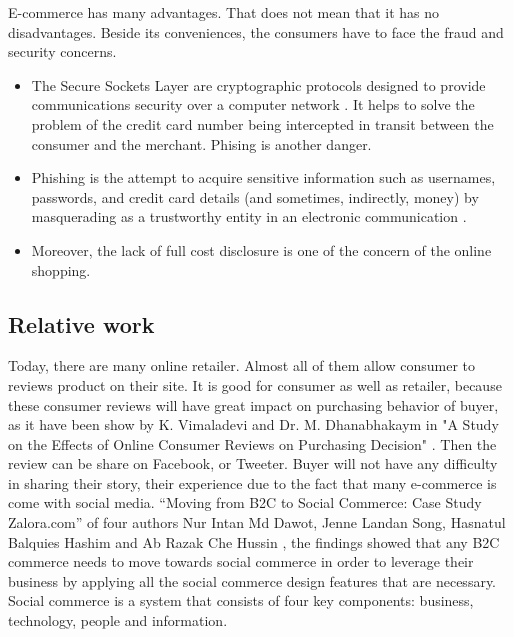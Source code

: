 \documentclass[conference]{IEEEtran}
\begin{document}
E-commerce has many advantages. That does not mean that it has no disadvantages. Beside its conveniences, the consumers have to face the fraud and security concerns.

\begin{itemize}
\item The Secure Sockets Layer are cryptographic protocols designed to provide communications security over a computer network \cite{dierks2008transport} . It helps to solve the problem of the credit card number being intercepted in transit between the consumer and the merchant. Phising is another danger.
\item Phishing is the attempt to acquire sensitive information such as usernames, passwords, and credit card details (and sometimes, indirectly, money) by masquerading as a trustworthy entity in an electronic communication \cite{ramzan2010phishing} \cite{van2005characteristics}.
\item Moreover, the lack of full cost disclosure is one of the concern of the online shopping.

\end{itemize}


\subsection{Relative work}

Today, there are many online retailer. Almost all of them allow consumer to reviews product on their site. It is good for consumer as well as retailer, because these consumer reviews will have great impact on purchasing behavior of buyer, as it have been show by K. Vimaladevi and Dr. M. Dhanabhakaym in "A Study on the Effects of Online Consumer Reviews on Purchasing Decision" \cite{vimaladevi2012study}. Then the review can be share on Facebook, or Tweeter. Buyer will not have any difficulty in sharing their story, their experience due to the fact that many e-commerce is come with social media. “Moving from B2C to Social Commerce: Case Study Zalora.com”  of four authors Nur Intan Md Dawot, Jenne Landan Song, Hasnatul Balquies Hashim and Ab Razak Che Hussin \cite{dawotmoving}, the findings showed that any B2C commerce needs to move towards social commerce in order to leverage their business by applying all the social commerce design features that are necessary. Social commerce is a system that consists of four key components: business, technology, people and information. \cite{zhou2013social}


\end{document}
